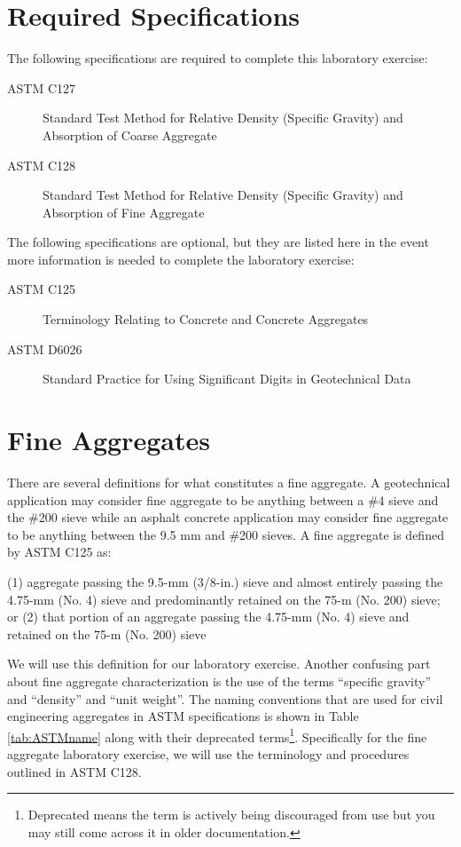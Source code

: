 \documentclass[12pt]{article}
\begin{document}
\section*{Required Specifications}
The following specifications are required to complete this laboratory exercise:
\begin{description}
\item[ASTM C127] Standard Test Method for Relative Density (Specific Gravity) and Absorption of Coarse Aggregate
\item[ASTM C128] Standard Test Method for Relative Density (Specific Gravity) and Absorption of Fine Aggregate
\end{description}

The following specifications are optional, but they are listed here in the event more information is needed to complete the laboratory exercise:
\begin{description}
\item[ASTM C125] Terminology Relating to Concrete and Concrete Aggregates
\item[ASTM D6026] Standard Practice for Using Significant Digits in Geotechnical Data
\end{description}
\pagebreak
\section{Fine Aggregates}
\label{sec:intro}
\normalsize 
There are several definitions for what constitutes a fine aggregate. A geotechnical application may consider fine aggregate to be anything between a \#4 sieve and the \#200 sieve while an asphalt concrete application may consider fine aggregate to be anything between the 9.5 mm and \#200 sieves. A fine aggregate is defined by ASTM C125 as:

\begin{letter}
(1) aggregate passing the 9.5-mm (3/8-in.) sieve and almost entirely passing the 4.75-mm (No. 4) sieve and predominantly retained on the 75-\textmu m (No. 200) sieve; or (2) that portion of an aggregate passing the 4.75-mm (No. 4) sieve and retained on the 75-\textmu m (No. 200) sieve
\end{letter}

We will use this definition for our laboratory exercise. Another confusing part about fine aggregate characterization is the use of the terms ``specific gravity'' and ``density'' and ``unit weight''. The naming conventions that are used for civil engineering aggregates in ASTM specifications is shown in Table \ref{tab:ASTMname} along with their deprecated terms\footnote{Deprecated means the term is actively being discouraged from use but you may still come across it in older documentation.}. Specifically for the fine aggregate laboratory exercise, we will use the terminology and procedures outlined in ASTM C128.
\end{document}
